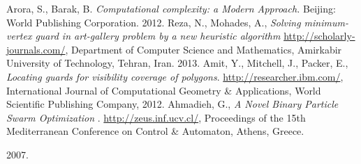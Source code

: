\documentclass[12pt]{article}
\begin{document}
\newpage
\begin{thebibliography}{99}

  Arora, S.,  Barak, B. 
  \emph{Computational complexity: a Modern Approach.}
  Beijing: World Publishing Corporation.
  2012.
  Reza, N., Mohades, A.,
  \emph{Solving minimum-vertex guard in art-gallery problem by a new heuristic algorithm}
  \href{http://scholarly-journals.com/sjmcs/archive/2013/June/pdf/Nami\%20and\%20Mohades.pdf}
       {http://scholarly-journals.com/},
       Department of Computer Science and Mathematics,
       Amirkabir University of Technology,
       Tehran, Iran.
       2013.
       Amit, Y., Mitchell, J., Packer, E.,
       \emph{Locating guards for visibility coverage of polygons}.
       \href{http://researcher.ibm.com/researcher/files/il-ELIP/ws-ijcga.pdf}
            {http://researcher.ibm.com/},
            International Journal of Computational Geometry \& Applications, 
            World Scientific Publishing Company,
            2012.
            Ahmadieh, G., 
            \emph{A Novel Binary Particle Swarm Optimization }.
            \href{http://zeus.inf.ucv.cl/~bcrawford/MII-748-METAHEURISTICAS/Papers_BinaryMH/A\%20novel\%20BPSO.pdf}
                 {http://zeus.inf.ucv.cl/},
                 Proceedings of the 15th Mediterranean Conference on Control \& Automaton,
                 Athens, Greece.
                 
                 2007.
\end{thebibliography}
\end{document}
